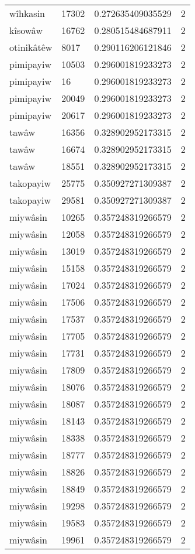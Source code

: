 \begin{longtable}{llll}
wîhkasin & 17302 & 0.272635409035529 & 2 \\
kîsowâw & 16762 & 0.280515484687911 & 2 \\
otinikâtêw & 8017 & 0.290116206121846 & 2 \\
pimipayiw & 10503 & 0.296001819233273 & 2 \\
pimipayiw & 16 & 0.296001819233273 & 2 \\
pimipayiw & 20049 & 0.296001819233273 & 2 \\
pimipayiw & 20617 & 0.296001819233273 & 2 \\
tawâw & 16356 & 0.328902952173315 & 2 \\
tawâw & 16674 & 0.328902952173315 & 2 \\
tawâw & 18551 & 0.328902952173315 & 2 \\
takopayiw & 25775 & 0.350927271309387 & 2 \\
takopayiw & 29581 & 0.350927271309387 & 2 \\
miywâsin & 10265 & 0.357248319266579 & 2 \\
miywâsin & 12058 & 0.357248319266579 & 2 \\
miywâsin & 13019 & 0.357248319266579 & 2 \\
miywâsin & 15158 & 0.357248319266579 & 2 \\
miywâsin & 17024 & 0.357248319266579 & 2 \\
miywâsin & 17506 & 0.357248319266579 & 2 \\
miywâsin & 17537 & 0.357248319266579 & 2 \\
miywâsin & 17705 & 0.357248319266579 & 2 \\
miywâsin & 17731 & 0.357248319266579 & 2 \\
miywâsin & 17809 & 0.357248319266579 & 2 \\
miywâsin & 18076 & 0.357248319266579 & 2 \\
miywâsin & 18087 & 0.357248319266579 & 2 \\
miywâsin & 18143 & 0.357248319266579 & 2 \\
miywâsin & 18338 & 0.357248319266579 & 2 \\
miywâsin & 18777 & 0.357248319266579 & 2 \\
miywâsin & 18826 & 0.357248319266579 & 2 \\
miywâsin & 18849 & 0.357248319266579 & 2 \\
miywâsin & 19298 & 0.357248319266579 & 2 \\
miywâsin & 19583 & 0.357248319266579 & 2 \\
miywâsin & 19961 & 0.357248319266579 & 2 \\

\end{longtable}
